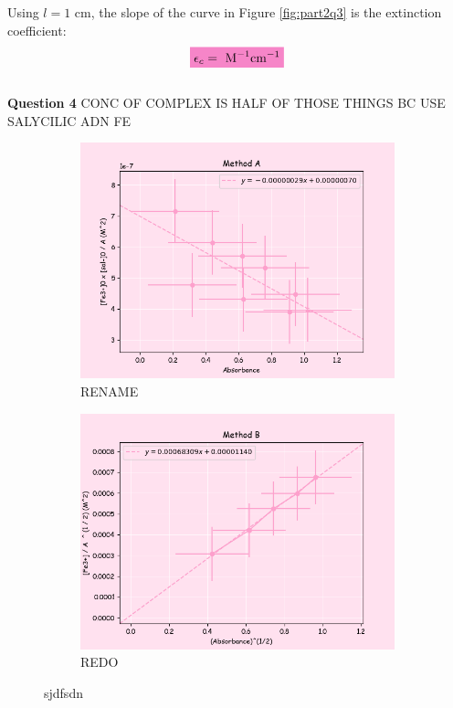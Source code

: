 Using $l = 1$ cm, the slope of the curve in Figure \ref{fig:part2q3} is the extinction coefficient:
\begin{equation}
   \mathcolorbox{Lavender}{ \epsilon_c =  \text{ M}^{-1}\text{cm} ^ {-1}}
    \label{eq:part2_ext_coeff}
\end{equation}
\\
\textbf{Question 4}
CONC OF COMPLEX IS HALF OF THOSE THINGS BC USE SALYCILIC ADN FE
\begin{figure}[H]
     \centering
     \begin{subfigure}[b]{0.49\textwidth}
         \centering
         \includegraphics[width=\textwidth]{part2_q4a.png}
         \caption{RENAME}
         \label{fig:part2_q4_a}
     \end{subfigure}
     \hfill
     \begin{subfigure}[b]{0.49\textwidth}
         \centering
         \includegraphics[width=\textwidth]{part2_q4b.png}
         \caption{REDO}
         \label{fig:part2_q4_b}
     \end{subfigure}
     \caption{sjdfsdn}
     \label{fig:part2q4}
\end{figure}

